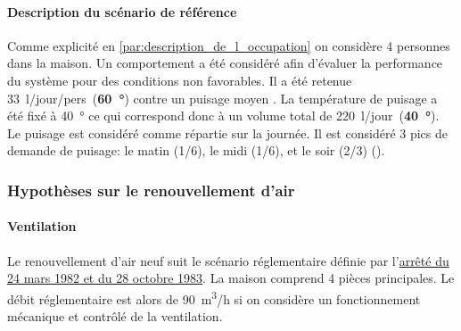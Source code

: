 \paragraph{Description du scénario de référence} %
\label{par:description_du_scénario_de_reference}
Comme explicité en \autoref{par:description_de_l_occupation} on considère 4 personnes
dans la maison. Un comportement  a été considéré
afin d’évaluer la performance du système pour des conditions non favorables. Il a été
retenue 33~\si{l/jour/pers}~(\textbf{60~\si{\degree}}) contre un puisage moyen
.
La température de puisage a été fixé à 40~\si{\degree} ce qui correspond donc
à un volume total de 220~\si{l/jour}~(\textbf{40~\si{\degree}}).
Le puisage est considéré comme répartie sur la journée. Il est considéré 3 pics de
demande de puisage: le matin (1/6), le midi (1/6), et le soir (2/3) ().



\subsubsection{Hypothèses sur le renouvellement d’air} %
\label{ssub:hypothèses_sur_le_renouvellement_d_air}

\paragraph{Ventilation} %
\label{par:ventilation}
Le renouvellement d’air neuf suit le scénario réglementaire définie par
l’\href{https://www.legifrance.gouv.fr/affichTexte.do?cidTexte=JORFTEXT000000862344}{arrêté du 24 mars 1982 et du 28 octobre 1983}.
La maison comprend 4 pièces principales. Le débit réglementaire est alors de 90~\si{m^{3}/h}
si on considère un fonctionnement mécanique et contrôlé de la ventilation.

